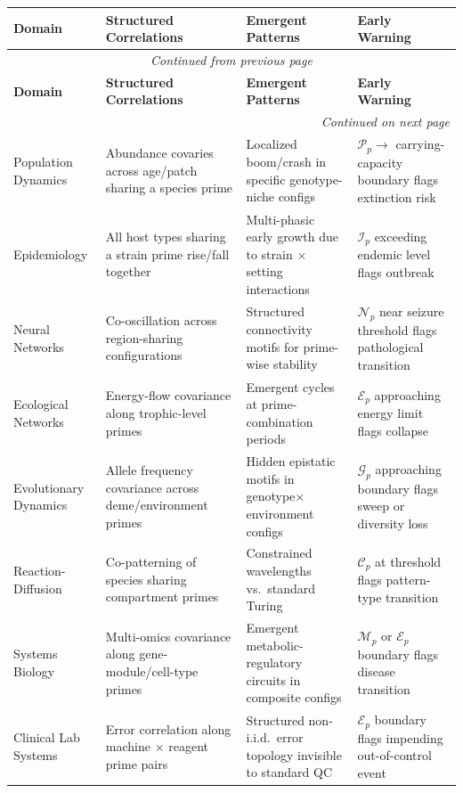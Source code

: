 \documentclass[12pt,letterpaper]{article}
\begin{document}
\begin{longtable}{p{3cm} p{4cm} p{4cm} p{3.5cm}}
\toprule
\textbf{Domain} & \textbf{Structured Correlations} &
\textbf{Emergent Patterns} & \textbf{Early Warning} \\
\midrule
\endfirsthead
\multicolumn{4}{c}{\textit{Continued from previous page}} \\
\toprule
\textbf{Domain} & \textbf{Structured Correlations} &
\textbf{Emergent Patterns} & \textbf{Early Warning} \\
\midrule
\endhead
\midrule
\multicolumn{4}{r}{\textit{Continued on next page}} \\
\endfoot
\bottomrule
\endlastfoot

Population Dynamics &
Abundance covaries across age/patch sharing a species prime &
Localized boom/crash in specific genotype-niche configs &
$\mathcal{P}_p \to$ carrying-capacity boundary flags extinction risk \\[6pt]

Epidemiology &
All host types sharing a strain prime rise/fall together &
Multi-phasic early growth due to strain $\times$ setting interactions &
$\mathcal{I}_p$ exceeding endemic level flags outbreak \\[6pt]

Neural Networks &
Co-oscillation across region-sharing configurations &
Structured connectivity motifs for prime-wise stability &
$\mathcal{N}_p$ near seizure threshold flags pathological transition \\[6pt]

Ecological Networks &
Energy-flow covariance along trophic-level primes &
Emergent cycles at prime-combination periods &
$\mathcal{E}_p$ approaching energy limit flags collapse \\[6pt]

Evolutionary Dynamics &
Allele frequency covariance across deme/environment primes &
Hidden epistatic motifs in genotype$\times$environment configs &
$\mathcal{G}_p$ approaching boundary flags sweep or diversity loss \\[6pt]

Reaction-Diffusion &
Co-patterning of species sharing compartment primes &
Constrained wavelengths vs.\ standard Turing &
$\mathcal{C}_p$ at threshold flags pattern-type transition \\[6pt]

Systems Biology &
Multi-omics covariance along gene-module/cell-type primes &
Emergent metabolic-regulatory circuits in composite configs &
$\mathcal{M}_p$ or $\mathcal{E}_p$ boundary flags disease transition \\[6pt]

Clinical Lab Systems &
Error correlation along machine $\times$ reagent prime pairs &
Structured non-i.i.d.\ error topology invisible to standard QC &
$\mathcal{E}_p$ boundary flags impending out-of-control event \\

\end{longtable}
\end{document}
